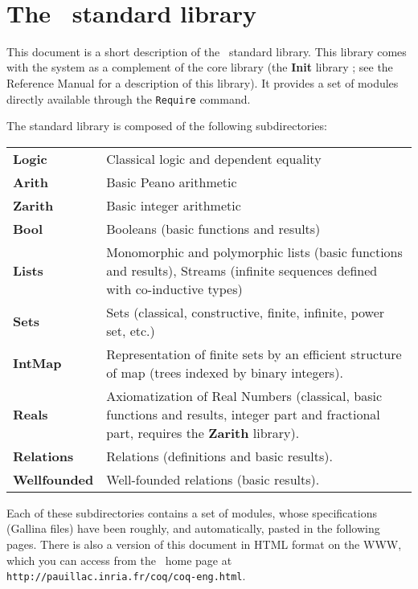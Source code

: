 \documentclass[11pt]{article}
\begin{document}
 
%
{\ }

\tableofcontents

\newpage
\section*{The \Coq\ standard library}

This document is a short description of the \Coq\ standard library.
This library comes with the system as a complement of the core library
(the {\bf Init} library ; see the Reference Manual for a description
of this library). It provides a set of modules directly available
through the \verb!Require! command.

The standard library is composed of the following subdirectories:

\medskip
\begin{tabular}{lp{12cm}}
  {\bf Logic}   & Classical logic and dependent equality \\
  {\bf Arith}   & Basic Peano arithmetic \\
  {\bf Zarith}  & Basic integer arithmetic \\
  {\bf Bool}    &  Booleans (basic functions and results) \\
  {\bf Lists}   & Monomorphic and polymorphic lists (basic functions and
            results), Streams (infinite sequences defined with co-inductive
            types) \\
  {\bf Sets}    & Sets (classical, constructive, finite, infinite, power set,
            etc.) \\
  {\bf IntMap}    & Representation of finite sets by an efficient
  structure of map (trees indexed by binary integers).\\
 {\bf Reals}   & Axiomatization of Real Numbers (classical, basic functions 
                 and results, integer part and fractional part,
                 requires the \textbf{Zarith} library).\\
 {\bf Relations} & Relations (definitions and basic results). \\
 {\bf Wellfounded} & Well-founded relations (basic results). \\

\end{tabular}
\medskip

Each of these subdirectories contains a set of modules, whose
specifications ({\sf Gallina} files) have
been roughly, and automatically, pasted in the following pages. There
is also a version of this document in HTML format on the WWW, which
you can access from the \Coq\ home page at
\texttt{http://pauillac.inria.fr/coq/coq-eng.html}.


\end{document}
